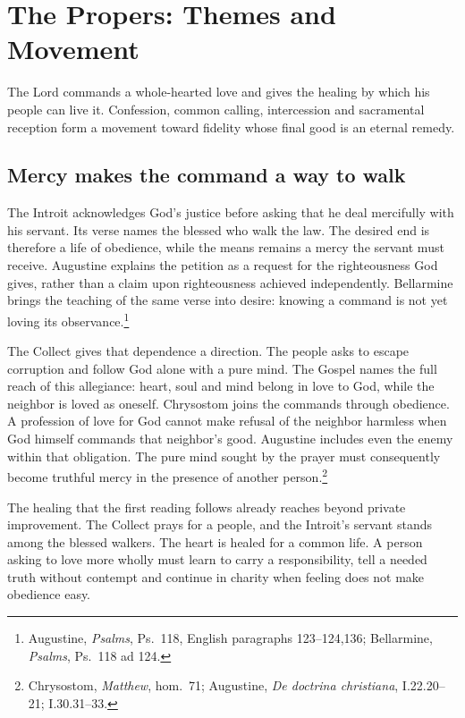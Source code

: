 
\section{The Propers: Themes and Movement}

The Lord commands a whole-hearted love and gives the healing by which his people can live it. Confession, common calling, intercession and sacramental reception form a movement toward fidelity whose final good is an eternal remedy.

\subsection{Mercy makes the command a way to walk}
The Introit acknowledges God's justice before asking that he deal mercifully with his servant. Its verse names the blessed who walk the law. The desired end is therefore a life of obedience, while the means remains a mercy the servant must receive. Augustine explains the petition as a request for the righteousness God gives, rather than a claim upon righteousness achieved independently. Bellarmine brings the teaching of the same verse into desire: knowing a command is not yet loving its observance.\footnote{Augustine, \textit{Psalms}, Ps.~118, English paragraphs 123--124,136; Bellarmine, \textit{Psalms}, Ps.~118 ad 124.}

The Collect gives that dependence a direction. The people asks to escape corruption and follow God alone with a pure mind. The Gospel names the full reach of this allegiance: heart, soul and mind belong in love to God, while the neighbor is loved as oneself. Chrysostom joins the commands through obedience. A profession of love for God cannot make refusal of the neighbor harmless when God himself commands that neighbor's good. Augustine includes even the enemy within that obligation. The pure mind sought by the prayer must consequently become truthful mercy in the presence of another person.\footnote{Chrysostom, \textit{Matthew}, hom.~71; Augustine, \textit{De doctrina christiana}, I.22.20--21; I.30.31--33.}

The healing that the first reading follows already reaches beyond private improvement. The Collect prays for a people, and the Introit's servant stands among the blessed walkers. The heart is healed for a common life. A person asking to love more wholly must learn to carry a responsibility, tell a needed truth without contempt and continue in charity when feeling does not make obedience easy.

